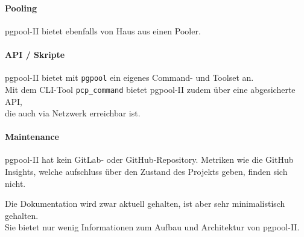 \begin{flushleft}
    \paragraph{Pooling}
    pgpool-II bietet ebenfalls von Haus aus einen Pooler.
\end{flushleft}
\begin{flushleft}
    \paragraph{API / Skripte}
    pgpool-II bietet mit \texttt{pgpool} ein eigenes Command- und Toolset an.\\
    Mit dem CLI-Tool \texttt{pcp\_command} bietet pgpool-II zudem über eine abgesicherte API,\\
    die auch via Netzwerk erreichbar ist.
\end{flushleft}
\begin{flushleft}
    \paragraph{Maintenance}
    pgpool-II hat kein GitLab- oder GitHub-Repository.
    Metriken wie die GitHub Insights, welche aufschluss über den Zustand des Projekts geben, finden sich nicht.
\end{flushleft}
\begin{flushleft}
    Die Dokumentation wird zwar aktuell gehalten, ist aber sehr minimalistisch gehalten.\\
    Sie bietet nur wenig Informationen zum Aufbau und Architektur von pgpool-II.
\end{flushleft}


